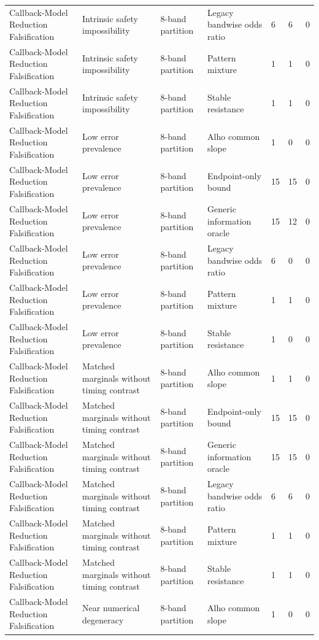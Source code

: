 \begin{tabular}{lllllll}
Callback-Model Reduction Falsification & Intrinsic safety impossibility & 8-band partition & Legacy bandwise odds ratio & 6 & 6 & 0 \\
Callback-Model Reduction Falsification & Intrinsic safety impossibility & 8-band partition & Pattern mixture & 1 & 1 & 0 \\
Callback-Model Reduction Falsification & Intrinsic safety impossibility & 8-band partition & Stable resistance & 1 & 1 & 0 \\
Callback-Model Reduction Falsification & Low error prevalence & 8-band partition & Alho common slope & 1 & 0 & 0 \\
Callback-Model Reduction Falsification & Low error prevalence & 8-band partition & Endpoint-only bound & 15 & 15 & 0 \\
Callback-Model Reduction Falsification & Low error prevalence & 8-band partition & Generic information oracle & 15 & 12 & 0 \\
Callback-Model Reduction Falsification & Low error prevalence & 8-band partition & Legacy bandwise odds ratio & 6 & 0 & 0 \\
Callback-Model Reduction Falsification & Low error prevalence & 8-band partition & Pattern mixture & 1 & 1 & 0 \\
Callback-Model Reduction Falsification & Low error prevalence & 8-band partition & Stable resistance & 1 & 0 & 0 \\
Callback-Model Reduction Falsification & Matched marginals without timing contrast & 8-band partition & Alho common slope & 1 & 1 & 0 \\
Callback-Model Reduction Falsification & Matched marginals without timing contrast & 8-band partition & Endpoint-only bound & 15 & 15 & 0 \\
Callback-Model Reduction Falsification & Matched marginals without timing contrast & 8-band partition & Generic information oracle & 15 & 15 & 0 \\
Callback-Model Reduction Falsification & Matched marginals without timing contrast & 8-band partition & Legacy bandwise odds ratio & 6 & 6 & 0 \\
Callback-Model Reduction Falsification & Matched marginals without timing contrast & 8-band partition & Pattern mixture & 1 & 1 & 0 \\
Callback-Model Reduction Falsification & Matched marginals without timing contrast & 8-band partition & Stable resistance & 1 & 1 & 0 \\
Callback-Model Reduction Falsification & Near numerical degeneracy & 8-band partition & Alho common slope & 1 & 0 & 0 \\

\end{tabular}
